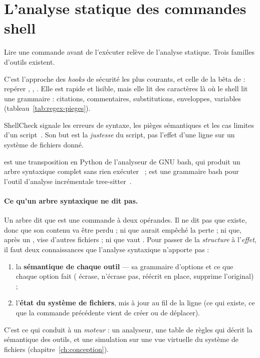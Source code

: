 \section{L'analyse statique des commandes shell}
\label{sec:statique}

Lire une commande avant de l'exécuter relève de l'analyse statique. Trois familles d'outils
existent.

\begin{description}[style=nextline,leftmargin=0.6cm,font=\sffamily\bfseries]
  \item[Les motifs (expressions régulières)]
    C'est l'approche des \textit{hooks} de sécurité les plus courants, et celle de la bêta
    de \demo{} : repérer , , . Elle est rapide et
    lisible, mais elle lit des caractères là où le shell lit une grammaire : citations,
    commentaires, substitutions, enveloppes, variables (tableau~\ref{tab:regex-pieges}).
  \item[Les analyseurs de qualité]
    ShellCheck signale les erreurs de syntaxe, les pièges sémantiques et les cas limites
    d'un script~\cite{shellcheck}. Son but est la \emph{justesse} du script, pas l'effet
    d'une ligne sur un système de fichiers donné.
  \item[Les analyseurs syntaxiques]
     est une transposition en Python de l'analyseur de GNU bash, qui produit un
    arbre syntaxique complet sans rien exécuter~\cite{bashlex} ;  est
    une grammaire bash pour l'outil d'analyse incrémentale tree-sitter~\cite{tree-sitter-bash}.
\end{description}

\paragraph{Ce qu'un arbre syntaxique ne dit pas.} Un arbre dit que 
est une commande  à deux opérandes. Il ne dit pas que  existe, donc que
son contenu va être perdu ; ni que  aurait empêché la perte ; ni que, après un
,  vise d'autres fichiers ; ni que  vaut .
Pour passer de la \emph{structure} à l'\emph{effet}, il faut deux connaissances que
l'analyse syntaxique n'apporte pas :
\begin{enumerate}
  \item la \textbf{sémantique de chaque outil} --- sa grammaire d'options et ce que chaque
    option fait ( écrase,  n'écrase pas,  réécrit en place,
     supprime l'original) ;
  \item l'\textbf{état du système de fichiers}, mis à jour au fil de la ligne (ce qui
    existe, ce que la commande précédente vient de créer ou de déplacer).
\end{enumerate}
C'est ce qui conduit \demo{} à un \emph{moteur} : un analyseur, une table de règles qui
décrit la sémantique des outils, et une simulation sur une vue virtuelle du système de
fichiers (chapitre~\ref{ch:conception}).

